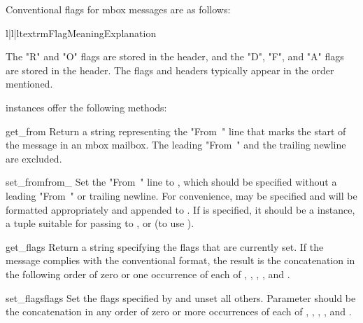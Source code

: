 Conventional flags for mbox messages are as follows:

\begin{tableiii}{l|l|l}{textrm}{Flag}{Meaning}{Explanation}
\end{tableiii}

The "R" and "O" flags are stored in the  header, and the
"D", "F", and "A" flags are stored in the  header. The
flags and headers typically appear in the order mentioned.

 instances offer the following methods:

\begin{methoddesc}{get_from}{}
Return a string representing the "From~" line that marks the start of the
message in an mbox mailbox. The leading "From~" and the trailing newline are
excluded.
\end{methoddesc}

\begin{methoddesc}{set_from}{from_}
Set the "From~" line to , which should be specified without a
leading "From~" or trailing newline. For convenience,  may be
specified and will be formatted appropriately and appended to . If
 is specified, it should be a  instance, a tuple
suitable for passing to , or  (to use
).
\end{methoddesc}

\begin{methoddesc}{get_flags}{}
Return a string specifying the flags that are currently set. If the message
complies with the conventional format, the result is the concatenation in the
following order of zero or one occurrence of each of ,
, , , and .
\end{methoddesc}

\begin{methoddesc}{set_flags}{flags}
Set the flags specified by  and unset all others. Parameter
 should be the concatenation in any order of zero or more
occurrences of each of , , ,
, and .
\end{methoddesc}

